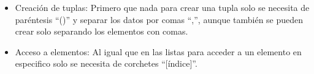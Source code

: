 \begin{itemize}
    \item Creación de tuplas: Primero que nada para crear una tupla solo se necesita de paréntesis ``()'' y separar los datos por comas ``,'', aunque también se pueden crear solo separando los elementos con comas.
    \begin{figure}[h]
        \centering
      \end{figure}

    \item Acceso a elementos: Al igual que en las listas para acceder a un elemento en especifico solo se necesita de corchetes ``[índice]''.
    \begin{figure}[h]
        \centering
      \end{figure}
    

\end{itemize}
